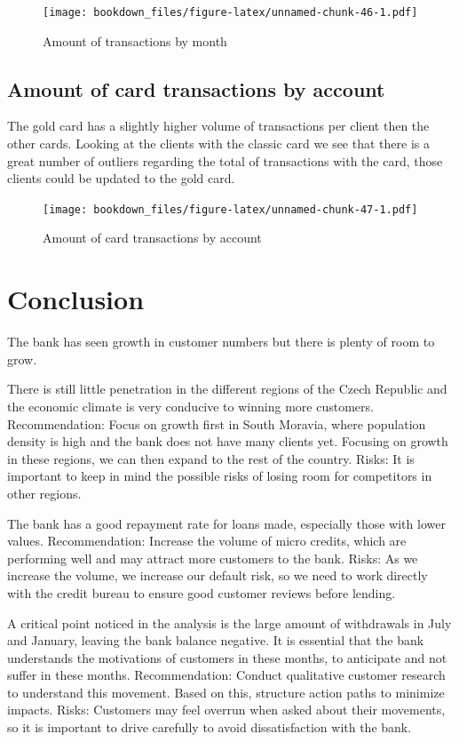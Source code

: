 \documentclass[]{book}
\begin{document}
\begin{figure}
\centering
\texttt{[image: bookdown\_files/figure-latex/unnamed-chunk-46-1.pdf]}
\caption{\label{fig:unnamed-chunk-46}Amount of transactions by month}
\end{figure}

\section{Amount of card transactions by
account}\label{amount-of-card-transactions-by-account}

The gold card has a slightly higher volume of transactions per client
then the other cards. Looking at the clients with the classic card we
see that there is a great number of outliers regarding the total of
transactions with the card, those clients could be updated to the gold
card.

\begin{figure}
\centering
\texttt{[image: bookdown\_files/figure-latex/unnamed-chunk-47-1.pdf]}
\caption{\label{fig:unnamed-chunk-47}Amount of card transactions by account}
\end{figure}

\chapter{Conclusion}\label{conclusion}

The bank has seen growth in customer numbers but there is plenty of room
to grow.

There is still little penetration in the different regions of the Czech
Republic and the economic climate is very conducive to winning more
customers. Recommendation: Focus on growth first in South Moravia, where
population density is high and the bank does not have many clients yet.
Focusing on growth in these regions, we can then expand to the rest of
the country. Risks: It is important to keep in mind the possible risks
of losing room for competitors in other regions.

The bank has a good repayment rate for loans made, especially those with
lower values. Recommendation: Increase the volume of micro credits,
which are performing well and may attract more customers to the bank.
Risks: As we increase the volume, we increase our default risk, so we
need to work directly with the credit bureau to ensure good customer
reviews before lending.

A critical point noticed in the analysis is the large amount of
withdrawals in July and January, leaving the bank balance negative. It
is essential that the bank understands the motivations of customers in
these months, to anticipate and not suffer in these months.
Recommendation: Conduct qualitative customer research to understand this
movement. Based on this, structure action paths to minimize impacts.
Risks: Customers may feel overrun when asked about their movements, so
it is important to drive carefully to avoid dissatisfaction with the
bank.
\end{document}
